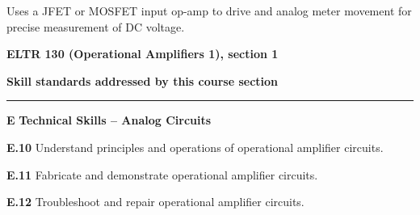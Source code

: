 \vskip 10pt

\noindent
{} Uses a JFET or MOSFET input op-amp to drive and analog meter movement for precise measurement of DC voltage.

\vskip 10pt






\vfil \eject

\centerline{\bf ELTR 130 (Operational Amplifiers 1), section 1} \bigskip 
 
\vskip 10pt

\noindent
{\bf Skill standards addressed by this course section}

\vskip 5pt

\hrule \vskip 10pt
\noindent
{}

\vskip 5pt

\medskip
\item{\bf E} {\bf Technical Skills -- Analog Circuits}
\item{\bf E.10} Understand principles and operations of operational amplifier circuits.
\item{\bf E.11} Fabricate and demonstrate operational amplifier circuits.
\item{\bf E.12} Troubleshoot and repair operational amplifier circuits.
\medskip

\vskip 5pt


